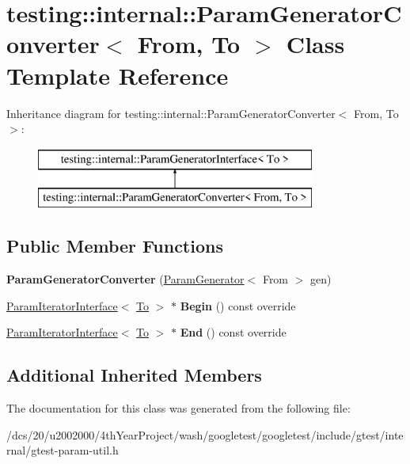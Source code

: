 \hypertarget{classtesting_1_1internal_1_1ParamGeneratorConverter}{}\section{testing\+:\+:internal\+:\+:Param\+Generator\+Converter$<$ From, To $>$ Class Template Reference}
\label{classtesting_1_1internal_1_1ParamGeneratorConverter}
Inheritance diagram for testing\+:\+:internal\+:\+:Param\+Generator\+Converter$<$ From, To $>$\+:\begin{figure}[H]
\begin{center}
\leavevmode
\includegraphics[height=2.000000cm]{classtesting_1_1internal_1_1ParamGeneratorConverter}
\end{center}
\end{figure}
\subsection*{Public Member Functions}
\begin{DoxyCompactItemize}
\item 
\mbox{\label{classtesting_1_1internal_1_1ParamGeneratorConverter_acc45b0fe99c85d3afd4f07a730f0ac77}} 
{\bfseries Param\+Generator\+Converter} (\mbox{\hyperlink{classtesting_1_1internal_1_1ParamGenerator}{Param\+Generator}}$<$ From $>$ gen)
\item 
\mbox{\label{classtesting_1_1internal_1_1ParamGeneratorConverter_ae0527ab3cef2aa385512ba2dc96bcc9e}} 
\mbox{\hyperlink{classtesting_1_1internal_1_1ParamIteratorInterface}{Param\+Iterator\+Interface}}$<$ \mbox{\hyperlink{classtesting_1_1internal_1_1To}{To}} $>$ $\ast$ {\bfseries Begin} () const override
\item 
\mbox{\label{classtesting_1_1internal_1_1ParamGeneratorConverter_ad30efc7085688fa607f4b87f0e1da37a}} 
\mbox{\hyperlink{classtesting_1_1internal_1_1ParamIteratorInterface}{Param\+Iterator\+Interface}}$<$ \mbox{\hyperlink{classtesting_1_1internal_1_1To}{To}} $>$ $\ast$ {\bfseries End} () const override
\end{DoxyCompactItemize}
\subsection*{Additional Inherited Members}


The documentation for this class was generated from the following file\+:\begin{DoxyCompactItemize}
\item 
/dcs/20/u2002000/4th\+Year\+Project/wash/googletest/googletest/include/gtest/internal/gtest-\/param-\/util.\+h\end{DoxyCompactItemize}
